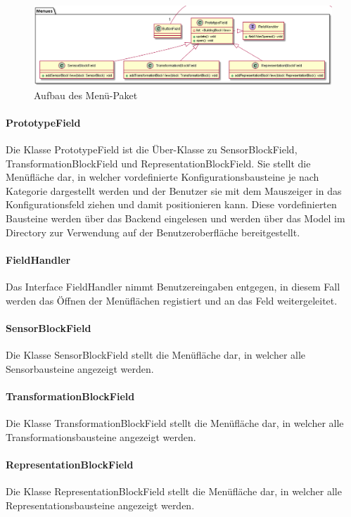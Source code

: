 \documentclass[parskip=full]{scrartcl}
\begin{document}
\begin{figure}[htbp]
	\begin{center}
		\includegraphics[width = 14cm]{Grafiken/MenuesNamespace.png}
		\caption{Aufbau des Menü-Paket}
		\label{Entwurf_Grob}
	\end{center}
\end{figure}

\paragraph{PrototypeField}
Die Klasse PrototypeField ist die Über-Klasse zu SensorBlockField, TransformationBlockField und RepresentationBlockField. 
Sie stellt die Menüfläche dar, in welcher vordefinierte Konfigurationsbausteine je nach Kategorie dargestellt werden und der Benutzer sie mit dem Mauszeiger in das Konfigurationsfeld ziehen und damit positionieren kann. Diese vordefinierten Bausteine werden über das Backend eingelesen und werden über das Model im Directory zur Verwendung auf der Benutzeroberfläche bereitgestellt.

\paragraph{FieldHandler}
Das Interface FieldHandler nimmt Benutzereingaben entgegen, in diesem Fall werden das Öffnen der Menüflächen registiert und an das Feld weitergeleitet.

\paragraph{SensorBlockField}
Die Klasse SensorBlockField stellt die Menüfläche dar, in welcher alle Sensorbausteine angezeigt werden.

\paragraph{TransformationBlockField}
Die Klasse TransformationBlockField stellt die Menüfläche dar, in welcher alle Transformationsbausteine angezeigt werden.

\paragraph{RepresentationBlockField}
Die Klasse RepresentationBlockField stellt die Menüfläche dar, in welcher alle Representationsbausteine angezeigt werden.
\end{document}
